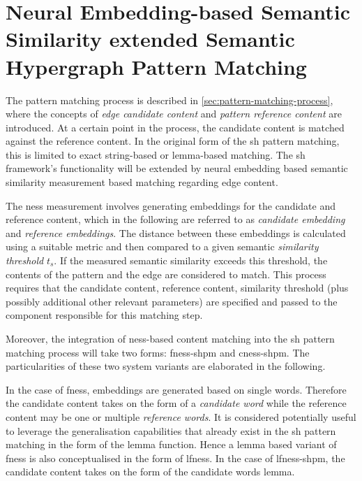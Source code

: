 \documentclass[11pt]{scrreprt}
\begin{document}
\section[Neural Embedding-based Semantic Similarity extended SH Pattern Matching]{Neural Embedding-based Semantic Similarity extended Semantic Hypergraph Pattern Matching}
The pattern matching process is described in \cref{sec:pattern-matching-process}, where the concepts of \textit{edge candidate content} and \textit{pattern reference content} are introduced. At a certain point in the process, the candidate content is matched against the reference content. In the original form of the \gls{sh} pattern matching, this is limited to exact string-based or lemma-based matching. The \gls{sh} framework's functionality will be extended by neural embedding based semantic similarity measurement based matching regarding edge content.

The \gls{ness} measurement involves generating embeddings for the candidate and reference content, which in the following are referred to as \textit{candidate embedding} and \textit{reference embeddings}. The distance between these embeddings is calculated using a suitable metric and then compared to a given semantic \textit{similarity threshold} \(t_s\). If the measured semantic similarity exceeds this threshold, the contents of the pattern and the edge are considered to match. This process requires that the candidate content, reference content, similarity threshold (plus possibly additional other relevant parameters) are specified and passed to the component responsible for this matching step.

Moreover, the integration of \gls{ness}-based content matching into the \gls{sh} pattern matching process will take two forms: \gls{fness-shpm} and \gls{cness-shpm}. The particularities of these two system variants are elaborated in the following.

In the case of \gls{fness}, embeddings are generated based on single words. Therefore the candidate content takes on the form of a \textit{candidate word} while the reference content may be one or multiple \textit{reference words}. It is considered potentially useful to leverage the generalisation capabilities that already exist in the \gls{sh} pattern matching in the form of the lemma function. Hence a lemma based variant of \gls{fness} is also conceptualised in the form of \gls{lfness}. In the case of \gls{lfness-shpm}, the candidate content takes on the form of the candidate words lemma.
\end{document}
